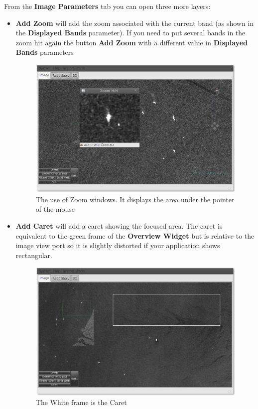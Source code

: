\documentclass[12pt,a4paper,final]{report}
\begin{document}
From the \textbf{Image Parameters} tab you can open three more layers:
\begin{itemize}
 \item \textbf{Add Zoom} will add the zoom associated with the current band (as shown in the \textbf{Displayed Bands} parameter).
If you need to put several bands in the zoom hit again the button \textbf{Add Zoom} with a different value in \textbf{Displayed Bands} parameters
\begin{figure}[H]
 \centering
 \includegraphics[scale=0.45,keepaspectratio=true]{./images/ZoomWindow.png}
 \caption{The use of Zoom windows. It displays the area under the pointer of the mouse}
\end{figure}

 \item \textbf{Add Caret} will add a caret showing the focused area.
The caret is equivalent to the green frame of the \textbf{Overview Widget} but is relative to the image view port
so it is slightly distorted if your application shows rectangular.
\begin{figure}[H]
 \centering
 \includegraphics[scale=0.45,keepaspectratio=true]{./images/CaretLayer.png}
 \caption{The White frame is the Caret}
\end{figure}
 

\end{itemize}
\end{document}
